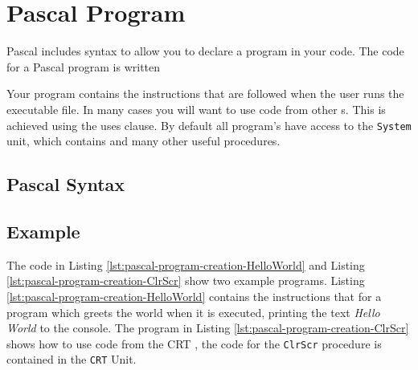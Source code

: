 \clearpage
\section{Pascal Program} %
\label{sec:pascal-basic-program}

Pascal includes syntax to allow you to declare a program in your code. The code for a Pascal program is written

Your program contains the instructions that are followed when the user runs the executable file. In many cases you will want to use code from other s. This is achieved using the uses clause. By default all program's have access to the \texttt{System} unit, which contains  and many other useful procedures.

\subsection*{Pascal Syntax} %
\label{sub:programsgeneralform}



\subsection*{Example} %
\label{sub:programExamples}

The code in Listing \ref{lst:pascal-program-creation-HelloWorld} and Listing \ref{lst:pascal-program-creation-ClrScr} show two example programs. Listing \ref{lst:pascal-program-creation-HelloWorld} contains the instructions that for a program which greets the world when it is executed, printing the text \emph{Hello World} to the console. The program in Listing \ref{lst:pascal-program-creation-ClrScr} shows how to use code from the CRT , the code for the \texttt{ClrScr} procedure is contained in the \texttt{CRT} Unit.





